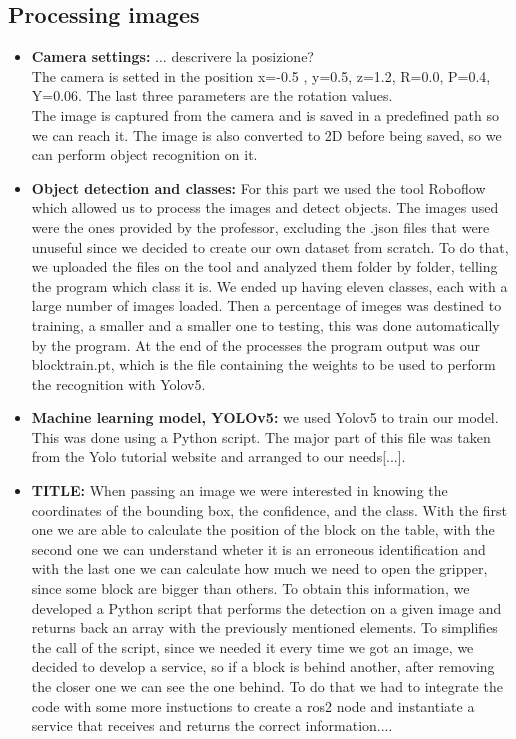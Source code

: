 \documentclass[12pt,a4paper]{article}
\begin{document}
\subsection{Processing images}\label{subsec:imageproc}
\begin{itemize}
    \item \textbf{Camera settings:} ... descrivere la posizione?\\
    The camera is setted in the position x=-0.5 , y=0.5, z=1.2, R=0.0, P=0.4, Y=0.06. The last three parameters are the rotation values.\\
    The image is captured from the camera and is saved in a predefined path so we can reach it. The image is also converted to 2D before being saved, so we can perform object recognition on it.
    \item \textbf{Object detection and classes:} For this part we used the tool Roboflow which allowed us to process the images and detect objects. The images used were the ones provided by the professor, excluding the .json files that were unuseful since we decided to create our own dataset from scratch. To do that, we uploaded the files on the tool and analyzed them folder by folder, telling the program which class it is. We ended up having eleven classes, each with a large number of images loaded. Then a percentage of imeges was destined to training, a smaller and a smaller one to testing, this was done automatically by the program. At the end of the processes the program output was our blocktrain.pt, which is the file containing the weights to be used to perform the recognition with Yolov5.
    \item \textbf{Machine learning model, YOLOv5:} we used Yolov5 to train our model. This was done using a Python script. The major part of this file was taken from the Yolo tutorial website and arranged to our needs[...]. 
    \item \textbf{TITLE:} When passing an image we were interested in knowing the coordinates of the bounding box, the confidence, and the class. With the first one we are able to calculate the position of the block on the table, with the second one we can understand wheter it is an erroneous identification and with the last one we can calculate how much we need to open the gripper, since some block are bigger than others. To obtain this information, we developed a Python script that performs the detection on a given image and returns back an array with the previously mentioned elements. To simplifies the call of the script, since we needed it every time we got an image, we decided to develop a service, so if a block is behind another, after removing the closer one we can see the one behind. To do that we had to integrate the code with some more instuctions to create a ros2 node and instantiate a service that receives and returns the correct information....\\

\end{itemize}
\end{document}

